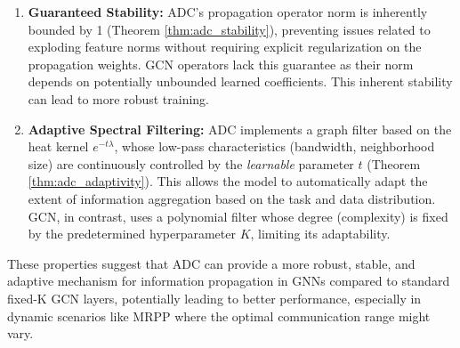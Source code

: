 \begin{enumerate}
    \item \textbf{Guaranteed Stability:} ADC's propagation operator norm is inherently bounded by 1 (Theorem \ref{thm:adc_stability}), preventing issues related to exploding feature norms without requiring explicit regularization on the propagation weights. GCN operators lack this guarantee as their norm depends on potentially unbounded learned coefficients. This inherent stability can lead to more robust training.
    \item \textbf{Adaptive Spectral Filtering:} ADC implements a graph filter based on the heat kernel $e^{-t\lambda}$, whose low-pass characteristics (bandwidth, neighborhood size) are continuously controlled by the \textit{learnable} parameter $t$ (Theorem \ref{thm:adc_adaptivity}). This allows the model to automatically adapt the extent of information aggregation based on the task and data distribution. GCN, in contrast, uses a polynomial filter whose degree (complexity) is fixed by the predetermined hyperparameter $K$, limiting its adaptability.
\end{enumerate}

These properties suggest that ADC can provide a more robust, stable, and adaptive mechanism for information propagation in GNNs compared to standard fixed-K GCN layers, potentially leading to better performance, especially in dynamic scenarios like MRPP where the optimal communication range might vary.




